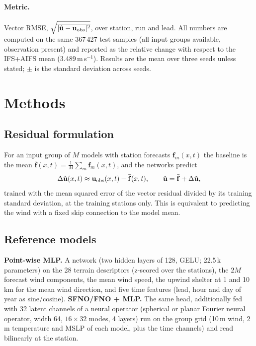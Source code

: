 \documentclass[10pt,a4paper]{article}
\begin{document}
\paragraph{Metric.} Vector RMSE, $\sqrt{\overline{|\hat{\mathbf u}-\mathbf u_{\rm obs}|^2}}$, over
station, run and lead. All numbers are computed on the same 367\,427 test samples (all input
groups available, observation present) and reported as the relative change with respect to the
IFS+AIFS mean (3.489\,m\,s$^{-1}$). Results are the mean over three seeds unless stated; $\pm$ is
the standard deviation across seeds.

\section{Methods}\label{sec:methods}
\subsection{Residual formulation}
For an input group of $M$ models with station forecasts $\mathbf f_m(x,t)$ the baseline is
the mean $\bar{\mathbf f}(x,t)=\frac1M\sum_m \mathbf f_m(x,t)$, and the networks predict
\begin{equation}
\Delta\hat{\mathbf u}(x,t) \approx \mathbf u_{\rm obs}(x,t)-\bar{\mathbf f}(x,t),\qquad
\hat{\mathbf u}=\bar{\mathbf f}+\Delta\hat{\mathbf u},
\end{equation}
trained with the mean squared error of the vector residual divided by its training standard
deviation, at the training stations only. This is equivalent to predicting the wind with a fixed
skip connection to the model mean.

\subsection{Reference models}
\textbf{Point-wise MLP.} A network (two hidden layers of 128, GELU; 22.5\,k parameters)
on the 28 terrain descriptors (z-scored over the stations), the $2M$ forecast wind components,
the mean wind speed, the upwind shelter at 1 and 10\,km for the mean wind direction, and five
time features (lead, hour and day of year as sine/cosine). \textbf{SFNO/FNO + MLP.} The same
head, additionally fed with 32 latent channels of a neural operator (spherical or planar Fourier
neural operator, width 64, $16\times32$ modes, 4 layers) run on the group grid (10\,m wind,
2\,m temperature and MSLP of each model, plus the time channels) and read bilinearly at the
station.
\end{document}
